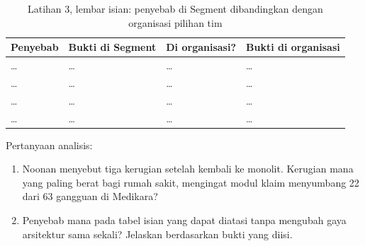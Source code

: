 \begin{table}[!htb]
  \centering
  \caption{Latihan 3, lembar isian: penyebab di Segment dibandingkan dengan organisasi pilihan tim}
  \label{tab:ch07-lat3-hasil}
  \footnotesize
  \begin{tabularx}{\textwidth}{>{\raggedright\arraybackslash}p{2.6cm} >{\raggedright\arraybackslash}X >{\raggedright\arraybackslash}p{1.5cm} >{\raggedright\arraybackslash}X}
    \hline
    \textbf{Penyebab} & \textbf{Bukti di Segment} & \textbf{Di organisasi?} & \textbf{Bukti di
      organisasi} \\ \hline
    \dots & \dots & \dots & \dots \\ \hline
    \dots & \dots & \dots & \dots \\ \hline
    \dots & \dots & \dots & \dots \\ \hline
    \dots & \dots & \dots & \dots \\ \hline
  \end{tabularx}
\end{table}

Pertanyaan analisis:
\begin{enumerate}
  \item Noonan menyebut tiga kerugian setelah kembali ke monolit. Kerugian mana yang paling berat
        bagi rumah sakit, mengingat modul klaim menyumbang 22 dari 63 gangguan di Medikara?
  \item Penyebab mana pada tabel isian yang dapat diatasi tanpa mengubah gaya arsitektur sama
        sekali? Jelaskan berdasarkan bukti yang diisi.
\end{enumerate}
